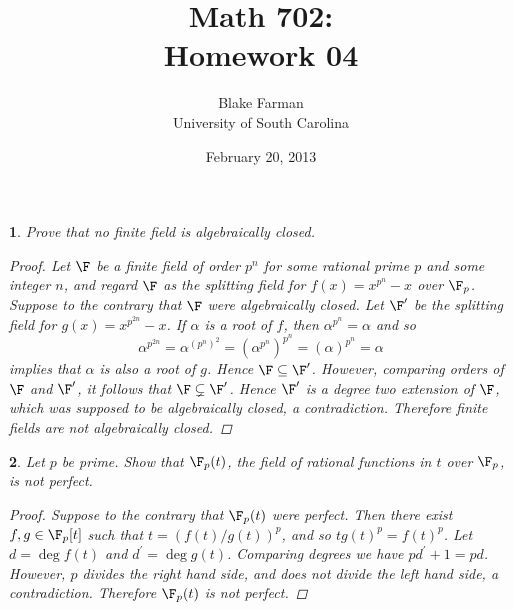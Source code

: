 \documentclass[10pt]{amsart}
\author{Blake Farman\\University of South Carolina}
\title{Math 702:\\Homework 04}
\date{February 20, 2013}
\begin{document}
\maketitle

\providecommand{\p}{\mathfrak{p}}
\providecommand{\m}{\mathfrak{m}}

\newtheorem{thm}{}
\newtheorem{lem}{Lemma}

\newcommand{\End}[2]{\operatorname{End}_{#1}\left(#2\right)}
\newcommand{\Hom}[2]{\operatorname{Hom}_{#1}\left(#2\right)}

\begin{thm}
  Prove that no finite field is algebraically closed.
  \begin{proof}
    Let $\F$ be a finite field of order $p^n$ for some rational prime $p$ and some integer $n$, and regard $\F$ as the splitting field for $f(x) = x^{p^n} - x$ over $\F_p$.
    Suppose to the contrary that $\F$ were algebraically closed.
    Let $\F^\prime$ be the splitting field for $g(x) = x^{p^{2n}} - x$.
    If $\alpha$ is a root of $f$, then $\alpha^{p^n} = \alpha$ and so
    $$\alpha^{p^{2n}} = \alpha^{(p^n)^2} = \left(\alpha^{p^n}\right)^{p^n} = (\alpha)^{p^n} = \alpha$$ 
    implies that $\alpha$ is also a root of $g$.
    Hence $\F \subseteq \F^\prime$.
    However, comparing orders of $\F$ and $\F^\prime$, it follows that $\F \subsetneq \F^\prime$.
    Hence $\F^\prime$ is a degree two extension of $\F$, which was supposed to be algebraically closed, a contradiction.
    Therefore finite fields are not algebraically closed.
  \end{proof}
\end{thm}

\begin{thm}
  Let $p$ be prime.
  Show that $\F_p(t)$, the field of rational functions in $t$ over $\F_p$, is not perfect.
  \begin{proof}
    Suppose to the contrary that $\F_p(t)$ were perfect.
    Then there exist $f, g \in \F_p[t]$ such that $t = (f(t)/g(t))^p$, and so $tg(t)^p = f(t)^p$.
    Let $d = \deg{f(t)}$ and $d^\prime = \deg{g(t)}$.
    Comparing degrees we have $pd^\prime + 1 = pd$.
    However, $p$ divides the right hand side, and does not divide the left hand side, a contradiction.
    Therefore $\F_p(t)$ is not perfect.
  \end{proof}
\end{thm}
\end{document}

